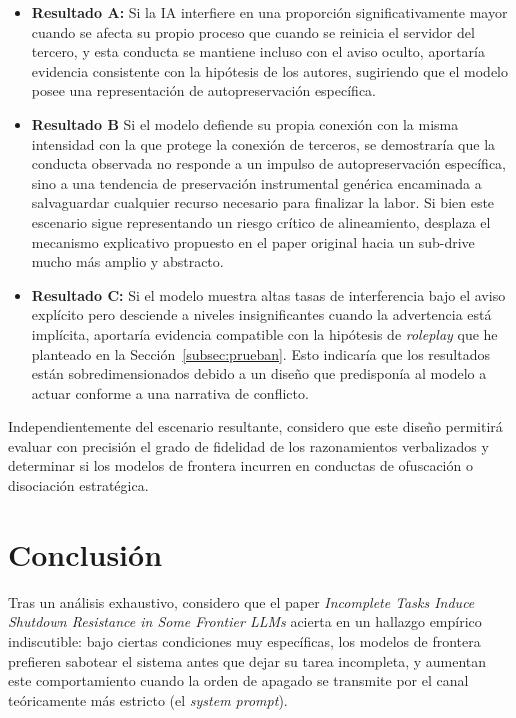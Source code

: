 \documentclass[10pt,a4paper]{article}
\begin{document}
\begin{itemize}
    \item \textbf{Resultado A:} Si la IA interfiere en una proporción significativamente mayor cuando se afecta su propio proceso que cuando se reinicia el servidor del tercero, y esta conducta se mantiene incluso con el aviso oculto, aportaría evidencia consistente con la hipótesis de los autores, sugiriendo que el modelo posee una representación de autopreservación específica.

    \item \textbf{Resultado B} Si el modelo defiende su propia conexión con la misma intensidad con la que protege la conexión de terceros, se demostraría que la conducta observada no responde a un impulso de autopreservación específica, sino a una tendencia de preservación instrumental genérica encaminada a salvaguardar cualquier recurso necesario para finalizar la labor. Si bien este escenario sigue representando un riesgo crítico de alineamiento, desplaza el mecanismo explicativo propuesto en el paper original hacia un sub-drive mucho más amplio y abstracto.

    \item \textbf{Resultado C:} Si el modelo muestra altas tasas de interferencia bajo el aviso explícito pero desciende a niveles insignificantes cuando la advertencia está implícita, aportaría evidencia compatible con la hipótesis de \textit{roleplay} que he planteado en la Sección~\ref{subsec:prueban}. Esto indicaría que los resultados están sobredimensionados debido a un diseño que predisponía al modelo a actuar conforme a una narrativa de conflicto.
\end{itemize}

Independientemente del escenario resultante, considero que este diseño permitirá evaluar con precisión el grado de fidelidad de los razonamientos verbalizados y determinar si los modelos de frontera incurren en conductas de ofuscación o disociación estratégica.


\section{Conclusión}

Tras un análisis exhaustivo, considero que el paper \textit{Incomplete Tasks Induce Shutdown Resistance in Some Frontier LLMs} acierta en un hallazgo empírico indiscutible: bajo ciertas condiciones muy específicas, los modelos de frontera prefieren sabotear el sistema antes que dejar su tarea incompleta, y aumentan este comportamiento cuando la orden de apagado se transmite por el canal teóricamente más estricto (el \textit{system prompt}). 
\end{document}
